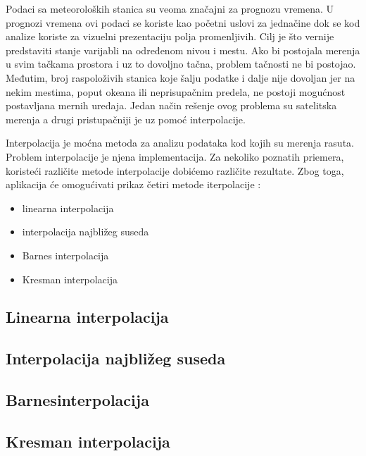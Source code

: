 \documentclass[12pt]{article}
\begin{document}
Podaci sa meteoroloških stanica su veoma značajni za prognozu vremena. U prognozi vremena ovi podaci se koriste kao početni uslovi za jednačine dok se kod analize koriste za vizuelni prezentaciju polja promenljivih. Cilj je što vernije predstaviti stanje varijabli na određenom nivou i mestu. Ako bi postojala merenja u svim tačkama prostora i uz to dovoljno tačna, problem tačnosti ne bi postojao. Međutim, broj raspoloživih stanica koje šalju podatke i dalje nije dovoljan jer na nekim mestima, poput okeana ili neprisupačnim predela, ne postoji mogućnost postavljana mernih uređaja. Jedan način rešenje ovog problema su satelitska merenja a drugi pristupačniji je uz pomoć interpolacije.

Interpolacija je moćna metoda za analizu podataka kod kojih su merenja rasuta. Problem interpolacije je njena implementacija. Za nekoliko poznatih priemera, koristeći različite metode interpolacije dobićemo različite rezultate. Zbog toga, aplikacija će omogućivati prikaz četiri metode iterpolacije :
\begin{itemize}
\item linearna interpolacija
\item interpolacija najbližeg suseda
\item Barnes interpolacija
\item Kresman interpolacija
\end{itemize}
\subsection{Linearna interpolacija}
\subsection{Interpolacija najbližeg suseda}
\subsection{Barnesinterpolacija}
\subsection{Kresman interpolacija}
\end{document}
